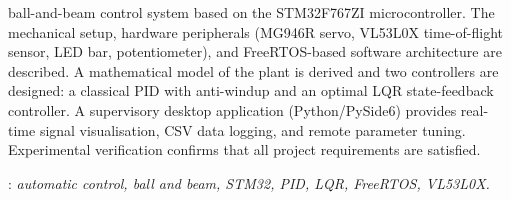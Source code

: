 \documentclass[12pt, a4paper]{report} %
\begin{document}
\begin{titlepage}
{ball-and-beam
    control system based on the STM32F767ZI microcontroller.
    The mechanical setup, hardware peripherals (MG946R servo, VL53L0X time-of-flight
    sensor, LED bar, potentiometer), and FreeRTOS-based software architecture are
    described.
    A mathematical model of the plant is derived and two controllers are designed:
    a classical PID with anti-windup and an optimal LQR state-feedback controller.
    A supervisory desktop application (Python/PySide6) provides real-time signal
    visualisation, CSV data logging, and remote parameter tuning.
    Experimental verification confirms that all project requirements are satisfied.
    }
    \vspace*{1\baselineskip}

    : {\itshape automatic control, ball and beam, STM32, PID,
    LQR, FreeRTOS, VL53L0X.}

\end{titlepage}
\end{document}
